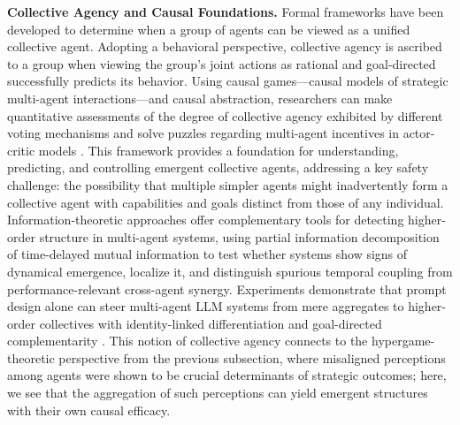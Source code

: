 \documentclass[11pt]{article}
\begin{document}
\textbf{Collective Agency and Causal Foundations.} Formal frameworks have been developed to determine when a group of agents can be viewed as a unified collective agent. Adopting a behavioral perspective, collective agency is ascribed to a group when viewing the group's joint actions as rational and goal-directed successfully predicts its behavior. Using causal games---causal models of strategic multi-agent interactions---and causal abstraction, researchers can make quantitative assessments of the degree of collective agency exhibited by different voting mechanisms and solve puzzles regarding multi-agent incentives in actor-critic models \cite{ref250}. This framework provides a foundation for understanding, predicting, and controlling emergent collective agents, addressing a key safety challenge: the possibility that multiple simpler agents might inadvertently form a collective agent with capabilities and goals distinct from those of any individual. Information-theoretic approaches offer complementary tools for detecting higher-order structure in multi-agent systems, using partial information decomposition of time-delayed mutual information to test whether systems show signs of dynamical emergence, localize it, and distinguish spurious temporal coupling from performance-relevant cross-agent synergy. Experiments demonstrate that prompt design alone can steer multi-agent LLM systems from mere aggregates to higher-order collectives with identity-linked differentiation and goal-directed complementarity \cite{ref251}. This notion of collective agency connects to the hypergame-theoretic perspective from the previous subsection, where misaligned perceptions among agents were shown to be crucial determinants of strategic outcomes; here, we see that the aggregation of such perceptions can yield emergent structures with their own causal efficacy.
\end{document}
